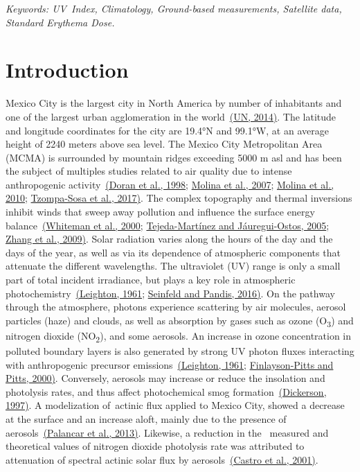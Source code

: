 \documentclass[10pt]{article}
\begin{document}
\sloppy


\emph{Keywords: UV~Index, Climatology, Ground-based measurements,
Satellite data, Standard Erythema Dose\emph{.~}~}


\section*{Introduction}

{\label{874460}}

Mexico City is the largest city in North America by number of
inhabitants and one of the largest urban agglomeration in the
world~\hyperref[csl:1]{(UN, 2014)}. The latitude and longitude coordinates for the
city are 19.4°N and 99.1°W, at an average height of 2240 meters above
sea level. The Mexico City Metropolitan Area (MCMA) is surrounded by
mountain ridges exceeding 5000 m asl and has been the subject of
multiples studies related to air quality due to intense anthropogenic
activity~\hyperref[csl:2]{(Doran et al., 1998}; \hyperref[csl:3]{Molina et al., 2007}; \hyperref[csl:4]{Molina et al., 2010}; \hyperref[csl:5]{Tzompa-Sosa et al., 2017)}. The complex topography and thermal
inversions inhibit winds that sweep away pollution and influence the
surface energy balance~\hyperref[csl:6]{(Whiteman et al., 2000}; \hyperref[csl:7]{Tejeda-Martínez and Jáuregui-Ostos, 2005}; \hyperref[csl:8]{Zhang et al., 2009)}. Solar radiation varies along
the hours of the day and the days of the year, as well as via its
dependence of atmospheric components that attenuate the different
wavelengths. The ultraviolet (UV) range is only a small part of total
incident irradiance, but plays a key role in atmospheric
photochemistry~\hyperref[csl:9]{(Leighton, 1961}; \hyperref[csl:10]{Seinfeld and Pandis, 2016)}. On the pathway through the
atmosphere, photons experience scattering by air molecules, aerosol
particles (haze) and clouds, as well as absorption by gases such as
ozone (O\textsubscript{3}) and nitrogen dioxide (NO\textsubscript{2}),
and some aerosols. An increase in ozone concentration in polluted
boundary layers is also generated by strong UV photon fluxes interacting
with anthropogenic precursor emissions~\hyperref[csl:9]{(Leighton, 1961}; \hyperref[csl:11]{Finlayson-Pitts and Pitts, 2000)}. Conversely,
aerosols may increase or reduce the insolation and photolysis rates, and
thus affect photochemical smog formation~\hyperref[csl:12]{(Dickerson, 1997)}. A
modelization of~actinic flux applied to Mexico City, showed a decrease
at the surface and an increase aloft, mainly due to the presence of
aerosols~\hyperref[csl:13]{(Palancar et al., 2013)}. Likewise, a reduction in the~ measured and
theoretical values of nitrogen dioxide photolysis rate was attributed to
attenuation of spectral actinic solar flux by
aerosols~\hyperref[csl:14]{(Castro et al., 2001)}.~
\end{document}

